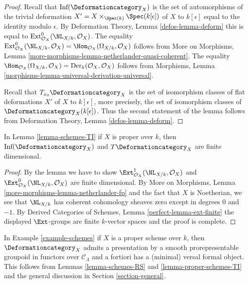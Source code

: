 \begin{proof}
Recall that $\text{Inf}(\Deformationcategory_X)$ is the set of
automorphisms of the trivial deformation
$X' = X \times_{\Spec(k)} \Spec(k[\epsilon])$ of $X$ to $k[\epsilon]$
equal to the identity modulo $\epsilon$.
By Deformation Theory, Lemma \ref{defos-lemma-deform}
this is equal to $\text{Ext}^0_{\mathcal{O}_X}(\NL_{X/k}, \mathcal{O}_X)$.
The equality $\text{Ext}^0_{\mathcal{O}_X}(\NL_{X/k}, \mathcal{O}_X) =
\Hom_{\mathcal{O}_X}(\Omega_{X/k}, \mathcal{O}_X)$ follows from
More on Morphisms, Lemma
\ref{more-morphisms-lemma-netherlander-quasi-coherent}.
The equality
$\Hom_{\mathcal{O}_X}(\Omega_{X/k}, \mathcal{O}_X) =
\text{Der}_k(\mathcal{O}_X, \mathcal{O}_X)$
follows from Morphisms, Lemma
\ref{morphisms-lemma-universal-derivation-universal}.

\medskip\noindent
Recall that $T_{x_0}\Deformationcategory_X$ is the set of isomorphism classes
of flat deformations $X'$ of $X$ to $k[\epsilon]$, more precisely,
the set of isomorphism classes of $\Deformationcategory_X(k[\epsilon])$.
Thus the second statement of the lemma follows from
Deformation Theory, Lemma \ref{defos-lemma-deform}.
\end{proof}

\begin{lemma}
\label{lemma-proper-schemes-TI}
In Lemma \ref{lemma-schemes-TI} if $X$ is proper over $k$, then
$\text{Inf}(\Deformationcategory_X)$ and $T\Deformationcategory_X$ are
finite dimensional.
\end{lemma}

\begin{proof}
By the lemma we have to show
$\Ext^1_{\mathcal{O}_X}(\NL_{X/k}, \mathcal{O}_X)$ and
$\Ext^0_{\mathcal{O}_X}(\NL_{X/k}, \mathcal{O}_X)$ are finite
dimensional. By More on Morphisms, Lemma
\ref{more-morphisms-lemma-netherlander-fp}
and the fact that $X$ is Noetherian, we see that
$\NL_{X/k}$ has coherent cohomology sheaves zero except
in degrees $0$ and $-1$.
By Derived Categories of Schemes, Lemma \ref{perfect-lemma-ext-finite}
the displayed $\Ext$-groups are finite $k$-vector spaces
and the proof is complete.
\end{proof}

\noindent
In Example \ref{example-schemes} if $X$ is a proper scheme over $k$,
then $\Deformationcategory_X$
admits a presentation by a smooth prorepresentable groupoid in functors
over $\mathcal{C}_\Lambda$
and a fortiori has a (minimal) versal formal object. This follows
from Lemmas \ref{lemma-schemes-RS} and
\ref{lemma-proper-schemes-TI}
and the general discussion in Section \ref{section-general}.

